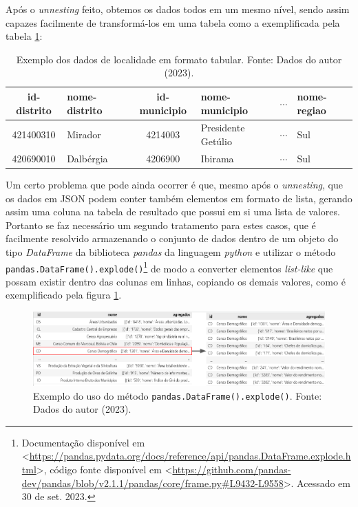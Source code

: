     Após o \textit{unnesting} feito, obtemos os dados todos em um mesmo nível, sendo assim capazes facilmente de transformá-los em uma tabela como a exemplificada pela tabela \ref{tab:exemplo-api-localidades}:

\begin{center}
    \begin{table}[h]
        \begin{tabular}{c l c l c l}
            \hline
                id-distrito & nome-distrito & id-municipio & nome-municipio & $\dotsi$ & nome-regiao\\
            \hline
                421400310 & Mirador & 4214003 & Presidente Getúlio & $\dotsi$ & Sul\\
                420690010 & Dalbérgia & 4206900 & Ibirama & $\dotsi$ & Sul\\     
            \hline
        \end{tabular}
        \caption{Exemplo dos dados de localidade em formato tabular. Fonte: Dados do autor (2023).}
        \label{tab:exemplo-api-localidades}
    \end{table}
\end{center}

    Um certo problema que pode ainda ocorrer é que, mesmo após o \textit{unnesting}, que os dados em JSON podem conter também elementos em formato de lista, gerando assim uma coluna na tabela de resultado que possui em si uma lista de valores. Portanto se faz necessário um segundo tratamento para estes casos, que é facilmente resolvido armazenando o conjunto de dados dentro de um objeto do tipo \textit{DataFrame} da biblioteca \textit{pandas} da linguagem \textit{python} e utilizar o método \lstinline{pandas.DataFrame().explode()}\footnote{Documentação disponível em <\url{https://pandas.pydata.org/docs/reference/api/pandas.DataFrame.explode.html}>, código fonte disponível em <\url{https://github.com/pandas-dev/pandas/blob/v2.1.1/pandas/core/frame.py\#L9432-L9558}>. Acessado em 30 de set. 2023.}     de modo a converter elementos \textit{list-like} que possam existir dentro das colunas em linhas, copiando os demais valores, como é exemplificado pela figura \ref{fig:exploding-df}.

\begin{figure}[h]
    \centering
    \includegraphics[width=\textwidth]{files/img/exploding_table.png}    \caption{Exemplo do uso do método \lstinline{pandas.DataFrame().explode()}. Fonte: Dados do autor (2023).}
    \label{fig:exploding-df}
\end{figure}

